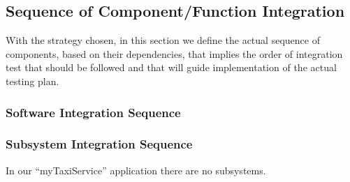 \subsection{Sequence of Component/Function Integration}
With the strategy chosen, in this section we define the actual sequence of components, based on their dependencies, that implies the order of integration test that should be followed and that will guide implementation of the actual testing plan. 
\subsubsection{Software Integration Sequence}
\subsubsection{Subsystem Integration Sequence}
In our ``myTaxiService'' application there are no subsystems.